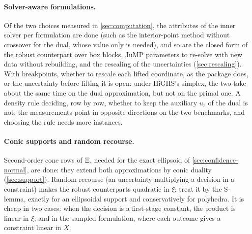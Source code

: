 \paragraph{Solver-aware formulations.}
Of the two choices measured in \cref{sec:computation}, the attributes of the inner solver per formulation are done
(such as the interior-point method without crossover for the dual, whose value only is needed),
and so are the closed form of the robust counterpart over box blocks, JuMP parameters to re-solve with new data without rebuilding,
and the rescaling of the uncertainties (\cref{sec:rescaling}).
With breakpoints, whether to rescale each lifted coordinate, as the package does, or the uncertainty before lifting it is open:
under HiGHS's simplex, the two take about the same time on the dual approximation, but not on the primal one.
A density rule deciding, row by row, whether to keep the auxiliary $u_r$ of the dual is not:
the measurements point in opposite directions on the two benchmarks, and choosing the rule needs more instances.

\paragraph{Conic supports and random recourse.}
Second-order cone rows of $\Xi$, needed for the exact ellipsoid of \cref{sec:confidence-normal}, are done:
they extend both approximations by conic duality \citep[Theorem~2.1]{GWK2015} (\cref{sec:support}).
Random recourse (an uncertainty multiplying a decision in a constraint) makes the robust counterparts quadratic in $\xi$:
\citet[Section~3]{KWG2011} treat it by the S-lemma, exactly for an ellipsoidal support and conservatively for polyhedra.
It is cheap in two cases: when the decision is a first-stage constant, the product is linear in $\xi$;
and in the sampled formulation, where each outcome gives a constraint linear in $X$.

